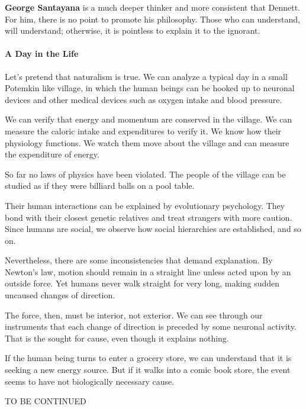 \textbf{George Santayana} is a much deeper thinker and more consistent that Dennett. For him, there is no point to promote his philosophy. Those who can understand, will understand; otherwise, it is pointless to explain it to the ignorant.

\paragraph{A Day in the Life}


Let's pretend that naturalism is true. We can analyze a typical day in a small Potemkin like village, in which the human beings can be hooked up to neuronal devices and other medical devices such as oxygen intake and blood pressure.

We can verify that energy and momentum are conserved in the village. We can measure the caloric intake and expenditures to verify it. We know how their physiology functions. We watch them move about the village and can measure the expenditure of energy.

So far no laws of physics have been violated. The people of the village can be studied as if they were billiard balls on a pool table.

Their human interactions can be explained by evolutionary psychology. They bond with their closest genetic relatives and treat strangers with more caution. Since humans are social, we observe how social hierarchies are established, and so on.

Nevertheless, there are some inconsistencies that demand explanation. By Newton's law, motion should remain in a straight line unless acted upon by an outside force. Yet humans never walk straight for very long, making sudden uncaused changes of direction.

The force, then, must be interior, not exterior. We can see through our instruments that each change of direction is preceded by some neuronal activity. That is the sought for cause, even though it explains nothing.

If the human being turns to enter a grocery store, we can understand that it is seeking a new energy source. But if it walks into a comic book store, the event seems to have not biologically necessary cause.

TO BE CONTINUED



